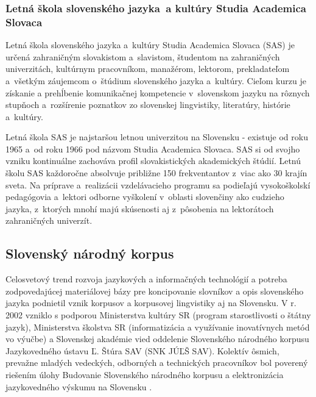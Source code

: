 \begin{multicols}{2}
\subsubsection{Letná škola slovenského jazyka~a kultúry Studia Academica Slovaca}
Letná škola slovenského jazyka a~kultúry Studia Academica Slovaca (SAS) je určená zahraničným slovakistom a~slavistom, študentom na zahraničných univerzitách, kultúrnym pracovníkom, manažérom, lektorom, prekladateľom a~všetkým záujemcom o~štúdium slovenského jazyka a~kultúry. Cieľom kurzu je získanie a prehĺbenie komunikačnej kompetencie v~slovenskom jazyku na rôznych stupňoch a~rozšírenie poznatkov zo slovenskej lingvistiky, literatúry, histórie a~kultúry.

Letná škola SAS je najstaršou letnou univerzitou na Slovensku - existuje od roku 1965 a~od roku 1966 pod názvom Studia Academica Slovaca. SAS si od svojho vzniku kontinuálne zachováva profil slovakistických akademických štúdií. Letnú školu SAS každoročne absolvuje približne 150 frekventantov z~viac ako 30 krajín sveta. Na príprave a~realizácii vzdelávacieho programu sa podieľajú vysokoškolskí pedagógovia a~lektori odborne vyškolení v~oblasti slovenčiny ako cudzieho jazyka, z~ktorých mnohí majú skúsenosti aj z~pôsobenia na lektorátoch zahraničných univerzít.


\subsection{Slovenský národný korpus}
Celosvetový trend rozvoja jazykových a informačných
technológií a potreba zodpovedajúcej materiálovej bázy pre
koncipovanie slovníkov a opis slovenského jazyka podnietil vznik
korpusov a korpusovej lingvistiky aj na Slovensku. V r. 2002 vzniklo s
podporou Ministerstva kultúry SR (program starostlivosti o štátny
jazyk), Ministerstva školstva SR (informatizácia a využívanie
inovatívnych metód vo výučbe) a Slovenskej akadémie vied oddelenie
Slovenského národného korpusu Jazykovedného ústavu Ľ. Štúra SAV
(SNK JÚĽŠ SAV). Kolektív ôsmich, prevažne mladých vedeckých,
odborných a technických pracovníkov bol poverený riešením úlohy
Budovanie Slovenského národného korpusu a elektronizácia
jazykovedného výskumu na Slovensku \cite{simkova2006b}.


\end{multicols}
